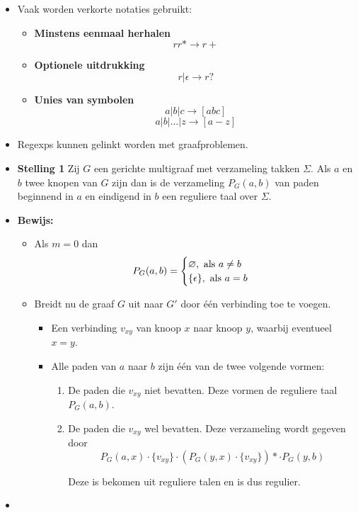 \begin{itemize}
\begin{table}[ht]
    \end{table}
    \item Vaak worden verkorte notaties gebruikt:
    \begin{itemize}
        \item \textbf{Minstens eenmaal herhalen}
        $$rr* \rightarrow r+$$
        \item \textbf{Optionele uitdrukking}
        $$r|\epsilon \rightarrow r?$$
        
        \item \textbf{Unies van symbolen}
        $$a|b|c \rightarrow [abc] $$
        $$a|b|\dots|z \rightarrow [a-z] $$

        
    \end{itemize}

    \item Regexps kunnen gelinkt worden met graafproblemen.
    \item \textbf{Stelling 1} Zij $G$ een gerichte multigraaf met verzameling takken $\Sigma$. Als $a$ en $b$ twee knopen van $G$ zijn dan is de verzameling $P_G(a, b)$ van paden beginnend in $a$ en eindigend in $b$ een reguliere taal over $\Sigma$.
    \item \textbf{Bewijs:}
    \begin{itemize}
        Via inductie op het aantal verbindingen $m$ van $G$.
        \item Als $m = 0$ dan
        $$P_G(a, b) = \begin{cases}
            \varnothing, \hbox{ als } a \neq b\\
            \{\epsilon\}, \hbox{ als } a = b 
        \end{cases}$$
        \item Breidt nu de graaf $G$ uit naar $G'$ door één verbinding toe te voegen.
        \begin{itemize}
            \item Een verbinding $v_{xy}$ van knoop $x$ naar knoop $y$, waarbij eventueel $x = y$.
            \item Alle paden van $a$ naar $b$ zijn één van de twee volgende vormen:
            \begin{enumerate}
                \item De paden die $v_{xy}$ niet bevatten. Deze vormen de reguliere taal $P_G(a, b)$.
                \item De paden die $v_{xy}$ wel bevatten. Deze verzameling wordt gegeven door
                $$P_G(a, x) \cdot \{v_{xy}\} \cdot (P_G(y, x) \cdot \{v_{xy}\})* \cdot P_G(y, b)$$

                Deze is bekomen uit reguliere talen en is dus regulier.
            \end{enumerate}
        \end{itemize}
    \end{itemize}
    \item 
\end{itemize}





